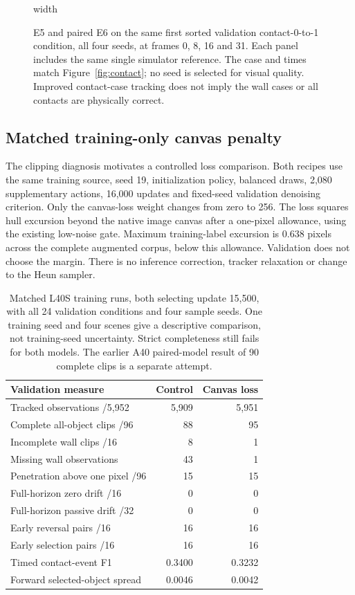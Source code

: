 \documentclass[11pt,a4paper]{article}
\begin{document}
\begin{figure}[!ht]
\centering
\pdfximage width\linewidth{report/figures/contact_followup.png}\pdfrefximage\pdflastximage
\caption{E5 and paired E6 on the same first sorted validation contact-0-to-1 condition, all four seeds, at frames 0, 8, 16 and 31. Each panel includes the same single simulator reference. The case and times match Figure~\ref{fig:contact}; no seed is selected for visual quality. Improved contact-case tracking does not imply the wall cases or all contacts are physically correct.}
\label{fig:contact_followup}
\end{figure}

\clearpage
\subsection{Matched training-only canvas penalty}
The clipping diagnosis motivates a controlled loss comparison. Both recipes use the same training source, seed 19, initialization policy, balanced draws, 2,080 supplementary actions, 16,000 updates and fixed-seed validation denoising criterion. Only the canvas-loss weight changes from zero to 256. The loss squares hull excursion beyond the native image canvas after a one-pixel allowance, using the existing low-noise gate. Maximum training-label excursion is 0.638 pixels across the complete augmented corpus, below this allowance. Validation does not choose the margin. There is no inference correction, tracker relaxation or change to the Heun sampler.

\begin{table}[!ht]
\centering
\begin{tabular}{lrr}
\hline
Validation measure & Control & Canvas loss \\
\hline
Tracked observations /5,952 & 5,909 & 5,951 \\
Complete all-object clips /96 & 88 & 95 \\
Incomplete wall clips /16 & 8 & 1 \\
Missing wall observations & 43 & 1 \\
Penetration above one pixel /96 & 15 & 15 \\
Full-horizon zero drift /16 & 0 & 0 \\
Full-horizon passive drift /32 & 0 & 0 \\
Early reversal pairs /16 & 16 & 16 \\
Early selection pairs /16 & 16 & 16 \\
Timed contact-event F1 & 0.3400 & 0.3232 \\
Forward selected-object spread & 0.0046 & 0.0042 \\
\hline
\end{tabular}
\caption{Matched L40S training runs, both selecting update 15,500, with all 24 validation conditions and four sample seeds. One training seed and four scenes give a descriptive comparison, not training-seed uncertainty. Strict completeness still fails for both models. The earlier A40 paired-model result of 90 complete clips is a separate attempt.}
\label{tab:wall_loss}
\end{table}
\end{document}
